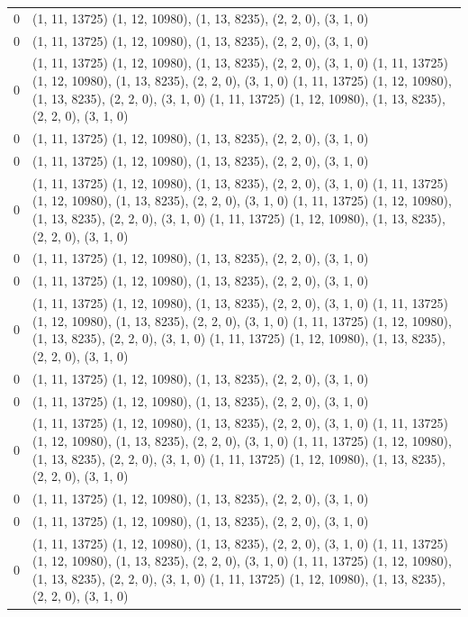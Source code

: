 \documentclass[9pt,twoside,openright,a4paper,pagesize]{report}
\begin{document}
\begin{longtable}{l | p{10cm}}
  0 & (1, 11, 13725) (1, 12, 10980), (1, 13, 8235), (2, 2, 0), (3, 1, 0) \\
  0 & (1, 11, 13725) (1, 12, 10980), (1, 13, 8235), (2, 2, 0), (3, 1, 0) \\
    0 & (1, 11, 13725) (1, 12, 10980), (1, 13, 8235), (2, 2, 0), (3, 1, 0) (1, 11, 13725) (1, 12, 10980), (1, 13, 8235), (2, 2, 0), (3, 1, 0) (1, 11, 13725) (1, 12, 10980), (1, 13, 8235), (2, 2, 0), (3, 1, 0) (1, 11, 13725) (1, 12, 10980), (1, 13, 8235), (2, 2, 0), (3, 1, 0) \\
  0 & (1, 11, 13725) (1, 12, 10980), (1, 13, 8235), (2, 2, 0), (3, 1, 0) \\
  0 & (1, 11, 13725) (1, 12, 10980), (1, 13, 8235), (2, 2, 0), (3, 1, 0) \\
  0 & (1, 11, 13725) (1, 12, 10980), (1, 13, 8235), (2, 2, 0), (3, 1, 0) (1, 11, 13725) (1, 12, 10980), (1, 13, 8235), (2, 2, 0), (3, 1, 0) (1, 11, 13725) (1, 12, 10980), (1, 13, 8235), (2, 2, 0), (3, 1, 0) (1, 11, 13725) (1, 12, 10980), (1, 13, 8235), (2, 2, 0), (3, 1, 0) \\
  0 & (1, 11, 13725) (1, 12, 10980), (1, 13, 8235), (2, 2, 0), (3, 1, 0) \\
  0 & (1, 11, 13725) (1, 12, 10980), (1, 13, 8235), (2, 2, 0), (3, 1, 0) \\
    0 & (1, 11, 13725) (1, 12, 10980), (1, 13, 8235), (2, 2, 0), (3, 1, 0) (1, 11, 13725) (1, 12, 10980), (1, 13, 8235), (2, 2, 0), (3, 1, 0) (1, 11, 13725) (1, 12, 10980), (1, 13, 8235), (2, 2, 0), (3, 1, 0) (1, 11, 13725) (1, 12, 10980), (1, 13, 8235), (2, 2, 0), (3, 1, 0) \\
  0 & (1, 11, 13725) (1, 12, 10980), (1, 13, 8235), (2, 2, 0), (3, 1, 0) \\
  0 & (1, 11, 13725) (1, 12, 10980), (1, 13, 8235), (2, 2, 0), (3, 1, 0) \\
  0 & (1, 11, 13725) (1, 12, 10980), (1, 13, 8235), (2, 2, 0), (3, 1, 0) (1, 11, 13725) (1, 12, 10980), (1, 13, 8235), (2, 2, 0), (3, 1, 0) (1, 11, 13725) (1, 12, 10980), (1, 13, 8235), (2, 2, 0), (3, 1, 0) (1, 11, 13725) (1, 12, 10980), (1, 13, 8235), (2, 2, 0), (3, 1, 0) \\
  0 & (1, 11, 13725) (1, 12, 10980), (1, 13, 8235), (2, 2, 0), (3, 1, 0) \\
  0 & (1, 11, 13725) (1, 12, 10980), (1, 13, 8235), (2, 2, 0), (3, 1, 0) \\
  0 & (1, 11, 13725) (1, 12, 10980), (1, 13, 8235), (2, 2, 0), (3, 1, 0) (1, 11, 13725) (1, 12, 10980), (1, 13, 8235), (2, 2, 0), (3, 1, 0) (1, 11, 13725) (1, 12, 10980), (1, 13, 8235), (2, 2, 0), (3, 1, 0) (1, 11, 13725) (1, 12, 10980), (1, 13, 8235), (2, 2, 0), (3, 1, 0) \\

\end{longtable}
\end{document}

